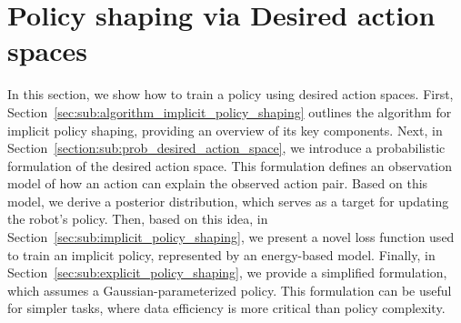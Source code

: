 \section{Policy shaping via Desired action spaces}
\label{sec:Policy_shaping}

In this section, we show how to train a policy using desired action spaces. 
First, Section~\ref{sec:sub:algorithm_implicit_policy_shaping} outlines the algorithm for implicit policy shaping, providing an overview of its key components.
Next, in Section~\ref{section:sub:prob_desired_action_space}, we introduce a probabilistic formulation of the desired action space. 
This formulation defines an observation model of how an action can explain the observed action pair. 
Based on this model, we derive a posterior distribution, which serves as a target for updating the robot's policy.
Then, based on this idea, in Section~\ref{sec:sub:implicit_policy_shaping}, we present a novel loss function used to train an implicit policy, represented by an energy-based model.
Finally, in Section~\ref{sec:sub:explicit_policy_shaping},  we provide a simplified formulation, which assumes a Gaussian-parameterized policy. This formulation can be useful for simpler tasks, where data efficiency is more critical than policy complexity.







